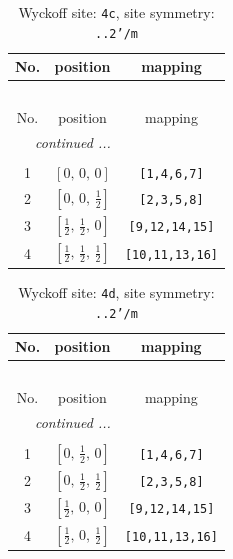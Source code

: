 \documentclass[fleqn,8pt]{jsarticle}
\begin{document}
\renewcommand{\arraystretch}{1.2}
\begin{longtable}{ccc}
\caption{Wyckoff site: {\tt 4c}, site symmetry: {\tt ..2'/m}}
 \\
 \hline \hline
No. & position & mapping \\ \hline \endfirsthead

\multicolumn{2}{l}{\tablename\ \thetable{}} \\
 \hline \hline
No. & position & mapping \\ \hline \endhead

 \hline \hline
\multicolumn{2}{r}{\footnotesize\it continued ...} \\ \endfoot

 \hline \hline
\multicolumn{2}{r}{} \\ \endlastfoot

1 & $\left[ 0,\, 0,\, 0 \right]$ & {\tt [1,4,6,7]} \\ \hline
2 & $\left[ 0,\, 0,\, \frac{1}{2} \right]$ & {\tt [2,3,5,8]} \\ \hline
3 & $\left[ \frac{1}{2},\, \frac{1}{2},\, 0 \right]$ & {\tt [9,12,14,15]} \\ \hline
4 & $\left[ \frac{1}{2},\, \frac{1}{2},\, \frac{1}{2} \right]$ & {\tt [10,11,13,16]} \\
\end{longtable}
\renewcommand{\arraystretch}{1.2}
\begin{longtable}{ccc}
\caption{Wyckoff site: {\tt 4d}, site symmetry: {\tt ..2'/m}}
 \\
 \hline \hline
No. & position & mapping \\ \hline \endfirsthead

\multicolumn{2}{l}{\tablename\ \thetable{}} \\
 \hline \hline
No. & position & mapping \\ \hline \endhead

 \hline \hline
\multicolumn{2}{r}{\footnotesize\it continued ...} \\ \endfoot

 \hline \hline
\multicolumn{2}{r}{} \\ \endlastfoot

1 & $\left[ 0,\, \frac{1}{2},\, 0 \right]$ & {\tt [1,4,6,7]} \\ \hline
2 & $\left[ 0,\, \frac{1}{2},\, \frac{1}{2} \right]$ & {\tt [2,3,5,8]} \\ \hline
3 & $\left[ \frac{1}{2},\, 0,\, 0 \right]$ & {\tt [9,12,14,15]} \\ \hline
4 & $\left[ \frac{1}{2},\, 0,\, \frac{1}{2} \right]$ & {\tt [10,11,13,16]} \\
\end{longtable}
\end{document}
